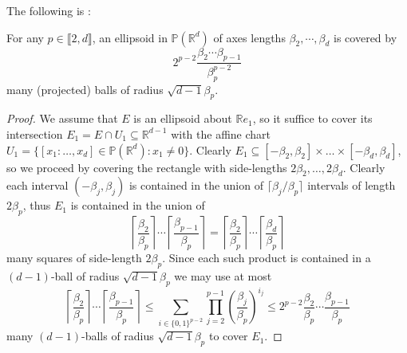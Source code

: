 \documentclass{report}
\begin{document}
The following is \cite[Lemma 3.7]{pozzetti_anosov_2023}:
\begin{lemma}\label{lem:ellipsoid_covering}
For any $p \in \llbracket 2, d \rrbracket$, an ellipsoid in $\mathbb P(\mathbb R^d)$ of axes lengths $\beta_2, \cdots, \beta_d$ is covered by
\[
    2^{p - 2} \frac{\beta_2 \cdots \beta_{p-1}}{\beta_p^{p-2}}
\]
many (projected) balls of radius $\sqrt{d-1} \beta_p$.
\end{lemma}
\begin{proof}
We assume that $E$ is an ellipsoid about $\mathbb R e_1$, so it suffice to cover its intersection $E_1 = E \cap U_1 \subseteq \mathbb R^{d-1}$ with the affine chart $U_1 = \{ [x_1: \ldots, x_d ] \in \mathbb P(\mathbb R^d) : x_1 \neq 0 \}$.
Clearly $E_1 \subseteq [-\beta_2, \beta_2] \times \ldots \times [-\beta_d, \beta_d]$, so we proceed by covering the rectangle with side-lengths $2\beta_2, \ldots, 2\beta_d$.
Clearly each interval $(-\beta_j, \beta_j)$ is contained in the union of $\lceil \beta_j/\beta_p \rceil$ intervals of length $2\beta_p$, thus $E_1$ is contained in the union of
\[
    \left\lceil \frac{\beta_2}{\beta_p} \right\rceil \cdots \left\lceil \frac{\beta_{p-1}}{\beta_p} \right\rceil =
    \left\lceil \frac{\beta_2}{\beta_p} \right\rceil \cdots \left\lceil \frac{\beta_d}{\beta_p} \right\rceil
\]
many squares of side-length $2\beta_p$.
Since each such product is contained in a $(d-1)$-ball of radius $\sqrt{d-1} \beta_p$ we may use at most
\[
    \left\lceil \frac{\beta_2}{\beta_p} \right\rceil \cdots \left\lceil \frac{\beta_{p-1}}{\beta_p} \right\rceil \leq
    \sum_{i \in \{ 0,1 \}^{p-2} } \prod_{j = 2}^{p-1} \left( \frac{\beta_j}{\beta_p} \right)^{i_j} \leq 2^{p-2} \frac{\beta_2}{\beta_p} \cdots \frac{\beta_{p-1}}{\beta_p}
\]
many $(d-1)$-balls of radius $\sqrt{d-1}\beta_p$ to cover $E_1$.
\end{proof}
\end{document}
